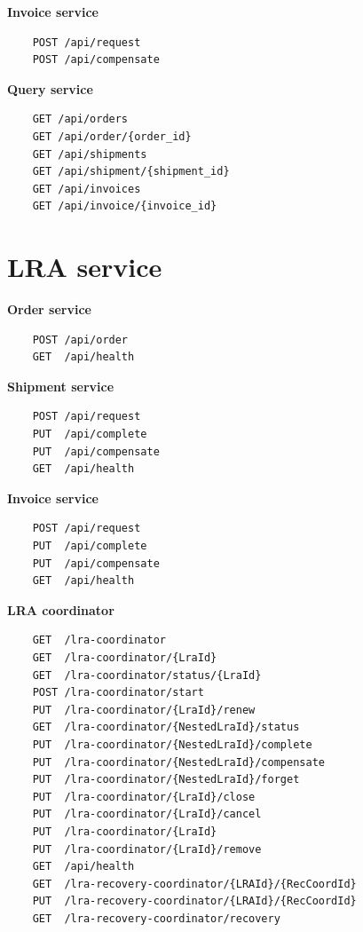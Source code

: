 \documentclass[oneside,
  digital, %
  table,   %
  nolof,     %
  nolot,     %
]{fithesis3}
\begin{document}
\noindent
\textbf{Invoice service}

\begin{verbatim}
    POST /api/request
    POST /api/compensate
\end{verbatim}

\noindent
\textbf{Query service}

\begin{verbatim}
    GET /api/orders
    GET /api/order/{order_id}
    GET /api/shipments
    GET /api/shipment/{shipment_id}
    GET /api/invoices
    GET /api/invoice/{invoice_id}
\end{verbatim}

\section{LRA service}

\textbf{Order service}

\begin{verbatim}
    POST /api/order
    GET  /api/health
\end{verbatim}

\noindent
\textbf{Shipment service}

\begin{verbatim}
    POST /api/request
    PUT  /api/complete
    PUT  /api/compensate
    GET  /api/health
\end{verbatim}

\noindent
\textbf{Invoice service}

\begin{verbatim}
    POST /api/request
    PUT  /api/complete
    PUT  /api/compensate
    GET  /api/health
\end{verbatim}

\noindent
\textbf{LRA coordinator}

\begin{verbatim}
    GET  /lra-coordinator
    GET  /lra-coordinator/{LraId}
    GET  /lra-coordinator/status/{LraId}
    POST /lra-coordinator/start
    PUT  /lra-coordinator/{LraId}/renew
    GET  /lra-coordinator/{NestedLraId}/status
    PUT  /lra-coordinator/{NestedLraId}/complete
    PUT  /lra-coordinator/{NestedLraId}/compensate
    PUT  /lra-coordinator/{NestedLraId}/forget
    PUT  /lra-coordinator/{LraId}/close
    PUT  /lra-coordinator/{LraId}/cancel
    PUT  /lra-coordinator/{LraId}
    PUT  /lra-coordinator/{LraId}/remove
    GET  /api/health
    GET  /lra-recovery-coordinator/{LRAId}/{RecCoordId}
    PUT  /lra-recovery-coordinator/{LRAId}/{RecCoordId}
    GET  /lra-recovery-coordinator/recovery
\end{verbatim}
\end{document}
